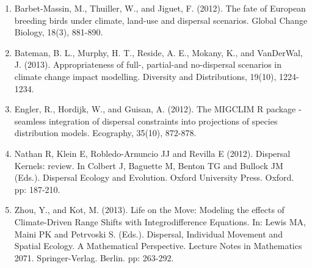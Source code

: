 \documentclass{article}\usepackage[]{graphicx}\usepackage[]{xcolor}
\begin{document}
\begin{enumerate}
\item Barbet-Massin, M., Thuiller, W., and Jiguet, F. (2012). The fate of European breeding birds under climate, land-use and dispersal scenarios. Global Change Biology, 18(3), 881-890.

\item Bateman, B. L., Murphy, H. T., Reside, A. E., Mokany, K., and VanDerWal, J. (2013). Appropriateness of full-, partial-and no-dispersal scenarios in climate change impact modelling. Diversity and Distributions, 19(10), 1224-1234.

\item Engler, R., Hordijk, W., and Guisan, A. (2012). The MIGCLIM R package - seamless integration of dispersal constraints into projections of species distribution models. Ecography, 35(10), 872-878.

\item Nathan R, Klein E, Robledo-Arnuncio JJ and Revilla E (2012). Dispersal Kernels: review. In Colbert J, Baguette M, Benton TG and Bullock JM (Eds.). Dispersal Ecology and Evolution. Oxford University Press. Oxford. pp: 187-210.

\item Zhou, Y., and Kot, M. (2013). Life on the Move: Modeling the effects of Climate-Driven Range Shifts with Integrodifference Equations. In: Lewis MA, Maini PK and Petrvoski S. (Eds.). Dispersal, Individual Movement and Spatial Ecology. A Mathematical Perspective. Lecture Notes in Mathematics 2071. Springer-Verlag. Berlin. pp: 263-292. 
\end{enumerate}
\end{document}
